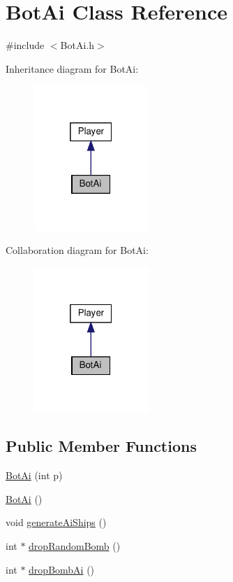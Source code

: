 \hypertarget{classBotAi}{}\section{Bot\+Ai Class Reference}
\label{classBotAi}


{\ttfamily \#include $<$Bot\+Ai.\+h$>$}



Inheritance diagram for Bot\+Ai\+:
\nopagebreak
\begin{figure}[H]
\begin{center}
\leavevmode
\includegraphics[width=124pt]{classBotAi__inherit__graph}
\end{center}
\end{figure}


Collaboration diagram for Bot\+Ai\+:
\nopagebreak
\begin{figure}[H]
\begin{center}
\leavevmode
\includegraphics[width=124pt]{classBotAi__coll__graph}
\end{center}
\end{figure}
\subsection*{Public Member Functions}
\begin{DoxyCompactItemize}
\item 
\hyperlink{classBotAi_af1cef6cb4b7d04919265e073443e1fc9}{Bot\+Ai} (int p)
\item 
\hyperlink{classBotAi_aeb58b1fa5a7fcf2bd51a3242f21e8b09}{Bot\+Ai} ()
\item 
void \hyperlink{classBotAi_a26e701cc128abb1862c49e4cad249a12}{generate\+Ai\+Ships} ()
\item 
int $\ast$ \hyperlink{classBotAi_a27834ee25890a2c462fcd3d318ca976f}{drop\+Random\+Bomb} ()
\item 
int $\ast$ \hyperlink{classBotAi_a3ec71cf63ede0307d303cda7d003051b}{drop\+Bomb\+Ai} ()
\end{DoxyCompactItemize}


